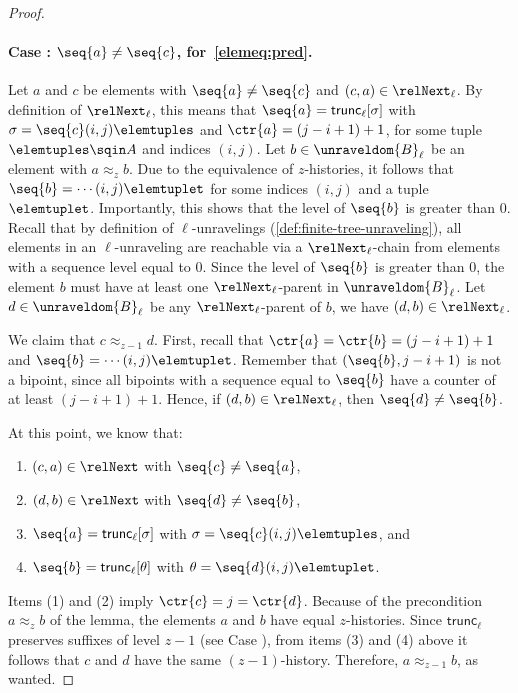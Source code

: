 \begin{proof}
  \paragraph{Case : $\seq{a} \ne \seq{c}$, for~\ref{elemeq:pred}.}
  Let $a$ and $c$ be elements with $\seq{a} \ne \seq{c}$ and $(c,a) \in \relNext_{\ell}$.
  By definition of $\relNext_{\ell}$, this means that $\seq{a} = \mathsf{trunc}_{\ell}[\sigma]$ with $\sigma = \seq{c}(i,j)\elemtuples$ and $\ctr{a} = (j-i+1)+1$, for some tuple $\elemtuples \sqin A$ and indices $(i,j)$.
  Let $b \in \unraveldom{B}_{\ell}$ be an element with $a \approx_{z} b$.
  Due to the equivalence of $z$-histories, it follows that $\seq{b} = \cdots (i,j) \elemtuplet$ for some indices $(i,j)$ and a tuple $\elemtuplet$.
  Importantly, this shows that the level of $\seq{b}$ is greater than 0.
  Recall that by definition of $\ell$-unravelings (\cref{def:finite-tree-unraveling}), all elements in an $\ell$-unraveling are reachable via a $\relNext_{\ell}$-chain from elements with a sequence level equal to 0.
  Since the level of $\seq{b}$ is greater than 0, the element $b$ must have at least one $\relNext_{\ell}$-parent in $\unraveldom{B}_{\ell}$.
  Let $d \in \unraveldom{B}_{\ell}$ be any $\relNext_{\ell}$-parent of $b$, \ie{} we have $(d,b) \in \relNext_{\ell}$.

  We claim that $c \approx_{z-1} d$.
  First, recall that $\ctr{a} = \ctr{b} = (j-i+1)+1$ and $\seq{b} = \cdots(i,j) \elemtuplet$.
  Remember that $(\seq{b}, j-i+1)$ is not a bipoint, since all bipoints with a sequence equal to $\seq{b}$ have a counter of at least $(j-i+1)+1$.
  Hence, if $(d,b) \in \relNext_{\ell}$, then $\seq{d} \ne \seq{b}$.

  At this point, we know that:
  \begin{enumerate}
    \item $(c,a) \in \relNext$ with $\seq{c} \ne \seq{a}$,
    \item $(d,b) \in \relNext$ with $\seq{d} \ne \seq{b}$,
    \item $\seq{a} = \mathsf{trunc}_{\ell}[\sigma]$ with $\sigma = \seq{c}(i,j)\elemtuples$, and
    \item $\seq{b} = \mathsf{trunc}_{\ell}[\theta]$ with $\theta = \seq{d}(i,j)\elemtuplet$.
  \end{enumerate}
  Items (1) and (2) imply $\ctr{c} = j = \ctr{d}$.
  Because of the precondition $a \approx_{z} b$ of the lemma, the elements $a$ and $b$ have equal $z$-histories.
  Since $\mathsf{trunc}_{\ell}$ preserves suffixes of level $z-1$ (see Case ), from items (3) and (4) above it follows that $c$ and $d$ have the same $(z-1)$-history.
  Therefore, $a \approx_{z-1} b$, as wanted.
\end{proof}
